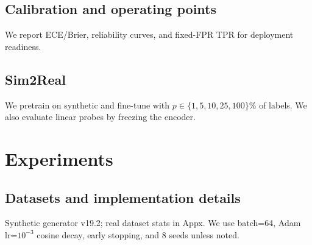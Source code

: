 \documentclass[10pt,conference]{IEEEtran}
\begin{document}
\subsection{Calibration and operating points}
We report ECE/Brier, reliability curves, and fixed-FPR TPR for deployment readiness.
\subsection{Sim2Real}
We pretrain on synthetic and fine-tune with $p\in\{1,5,10,25,100\}\%$ of labels. We also evaluate linear probes by freezing the encoder.

\section{Experiments}
\subsection{Datasets and implementation details}
Synthetic generator v19.2; real dataset stats in Appx. We use batch=64, Adam lr=$10^{-3}$ cosine decay, early stopping, and 8 seeds unless noted.
\end{document}
